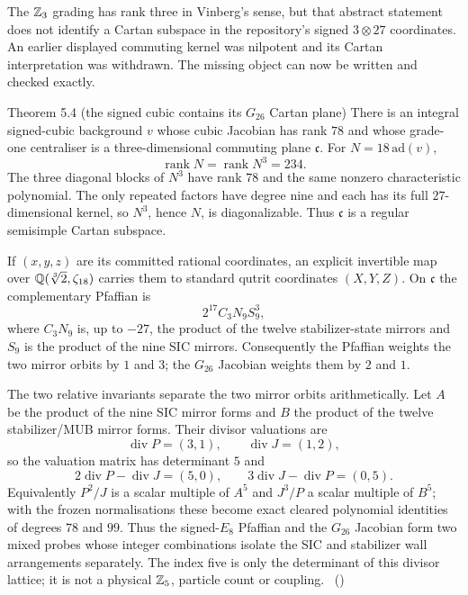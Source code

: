 The $\mathbb{Z}_3$ grading has rank three in Vinberg's sense, but that abstract statement does
not identify a Cartan subspace in the repository's signed $3\otimes27$ coordinates. An
earlier displayed commuting kernel was nilpotent and its Cartan interpretation was
withdrawn. The missing object can now be written and checked exactly.

\begin{result}{Theorem 5.4 (the signed cubic contains its $G_{26}$ Cartan plane)
\hfill \tierC}
There is an integral signed-cubic background $v$ whose cubic Jacobian has rank $78$ and
whose grade-one centraliser is a three-dimensional commuting plane $\mathfrak c$. For
$N=18\,\mathrm{ad}(v)$,
\[
 \operatorname{rank} N=\operatorname{rank} N^3=234.
\]
The three diagonal blocks of $N^3$ have rank $78$ and the same nonzero characteristic
polynomial. The only repeated factors have degree nine and each has its full
$27$-dimensional kernel, so $N^3$, hence $N$, is diagonalizable. Thus $\mathfrak c$ is a
regular semisimple Cartan subspace. 

If $(x,y,z)$ are its committed rational coordinates, an explicit invertible map over
$\mathbb{Q}(\sqrt[3]2,\zeta_{18})$ carries them to standard qutrit coordinates $(X,Y,Z)$. On
$\mathfrak c$ the complementary Pfaffian is
\[
  2^{17}C_3N_9S_9^3,
\]
where $C_3N_9$ is, up to $-27$, the product of the twelve stabilizer-state mirrors and
$S_9$ is the product of the nine SIC mirrors. Consequently the Pfaffian weights the two
mirror orbits by $1$ and $3$; the $G_{26}$ Jacobian weights them by $2$ and $1$.
\end{result}

The two relative invariants separate the two mirror orbits arithmetically. Let $A$ be
the product of the nine SIC mirror forms and $B$ the product of the twelve
stabilizer/MUB mirror forms. Their divisor valuations are
\[
 \operatorname{div}P=(3,1),\qquad \operatorname{div}J=(1,2),
\]
so the valuation matrix has determinant $5$ and
\[
 2\operatorname{div}P-\operatorname{div}J=(5,0),\qquad
 3\operatorname{div}J-\operatorname{div}P=(0,5).
\]
Equivalently $P^2/J$ is a scalar multiple of $A^5$ and $J^3/P$ a scalar
multiple of $B^5$; with the frozen normalisations these become exact cleared
polynomial identities of degrees $78$ and $99$. Thus the signed-$E_8$ Pfaffian
and the $G_{26}$ Jacobian form two mixed probes whose integer combinations
isolate the SIC and stabilizer wall arrangements separately. The index five is
only the determinant of this divisor lattice; it is not a physical $\mathbb{Z}_5$,
particle count or coupling. \tierC\ ()

